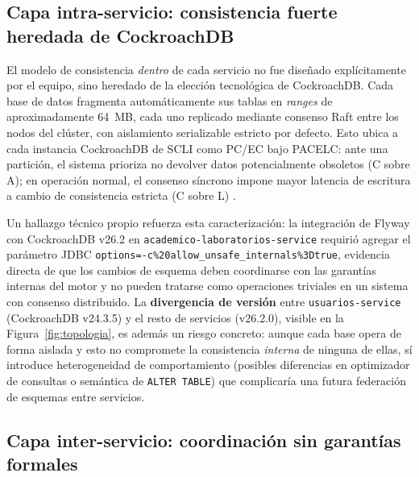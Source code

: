 \documentclass[12pt,letterpaper]{article}
\begin{document}
\subsection{Capa intra-servicio: consistencia fuerte heredada de CockroachDB}

El modelo de consistencia \emph{dentro} de cada servicio no fue dise\~nado
expl\'icitamente por el equipo, sino heredado de la elecci\'on tecnol\'ogica
de CockroachDB. Cada base de datos fragmenta autom\'aticamente sus tablas
en \emph{ranges} de aproximadamente 64~MB, cada uno replicado mediante
consenso Raft entre los nodos del cl\'uster, con aislamiento serializable
estricto por defecto. Esto ubica a cada instancia CockroachDB de SCLI como
PC/EC bajo PACELC: ante una partici\'on, el sistema prioriza no devolver
datos potencialmente obsoletos (C sobre A); en operaci\'on normal, el
consenso s\'incrono impone mayor latencia de escritura a cambio de
consistencia estricta (C sobre L) \cite{abadi2012}.

Un hallazgo t\'ecnico propio refuerza esta caracterizaci\'on: la
integraci\'on de Flyway con CockroachDB v26.2 en
\texttt{academico-laboratorios-service} requiri\'o agregar el par\'ametro
JDBC \texttt{options=-c\%20allow\_unsafe\_internals\%3Dtrue}, evidencia
directa de que los cambios de esquema deben coordinarse con las garant\'ias
internas del motor y no pueden tratarse como operaciones triviales en un
sistema con consenso distribuido. La \textbf{divergencia de versi\'on}
entre \texttt{usuarios-service} (CockroachDB v24.3.5) y el resto de
servicios (v26.2.0), visible en la Figura~\ref{fig:topologia}, es adem\'as
un riesgo concreto: aunque cada base opera de forma aislada y esto no
compromete la consistencia \emph{interna} de ninguna de ellas, s\'i
introduce heterogeneidad de comportamiento (posibles diferencias en
optimizador de consultas o semántica de \texttt{ALTER TABLE}) que
complicar\'ia una futura federaci\'on de esquemas entre servicios.

\subsection{Capa inter-servicio: coordinaci\'on sin garant\'ias formales}
\end{document}
